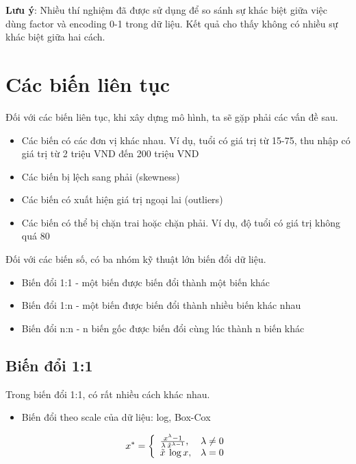 \documentclass[]{krantz}
\providecommand{\tightlist}{%
  \setlength{\itemsep}{0pt}\setlength{\parskip}{0pt}}
\theoremstyle{definition}
\theoremstyle{definition}
\theoremstyle{definition}
\theoremstyle{remark}
\begin{document}
\textbf{Lưu ý}: Nhiều thí nghiệm đã được sử dụng để so sánh sự khác biệt
giữa việc dùng factor và encoding 0-1 trong dữ liệu. Kết quả cho thấy
không có nhiều sự khác biệt giữa hai cách.

\hypertarget{cac-bin-lien-tuc}{%
\section{Các biến liên tục}\label{cac-bin-lien-tuc}}

Đối với các biến liên tục, khi xây dựng mô hình, ta sẽ gặp phải các vấn
đề sau.

\begin{itemize}
\tightlist
\item
  Các biến có các đơn vị khác nhau. Ví dụ, tuổi có giá trị từ 15-75, thu
  nhập có giá trị từ 2 triệu VND đến 200 triệu VND
\item
  Các biến bị lệch sang phải (skewness)
\item
  Các biến có xuất hiện giá trị ngoại lai (outliers)
\item
  Các biến có thể bị chặn trai hoặc chặn phải. Ví dụ, độ tuổi có giá trị
  không quá 80
\end{itemize}

Đối với các biến số, có ba nhóm kỹ thuật lớn biến đổi dữ liệu.

\begin{itemize}
\tightlist
\item
  Biến đổi 1:1 - một biến được biến đổi thành một biến khác
\item
  Biến đổi 1:n - một biến được biến đổi thành nhiều biến khác nhau
\item
  Biến đổi n:n - n biến gốc được biến đổi cùng lúc thành n biến khác
\end{itemize}

\hypertarget{bin-i-11}{%
\subsection{Biến đổi 1:1}\label{bin-i-11}}

Trong biến đổi 1:1, có rất nhiều cách khác nhau.

\begin{itemize}
\tightlist
\item
  Biến đổi theo scale của dữ liệu: log, Box-Cox
\end{itemize}

\[x^{*} = \left\{ \begin{array}{l l} \frac{x^{\lambda}-1}{\lambda\: \tilde{x}^{\lambda-1}}, & \lambda \neq 0 \\ \tilde{x} \: \log x, & \lambda = 0 \\ \end{array} \right.\]
\end{document}
